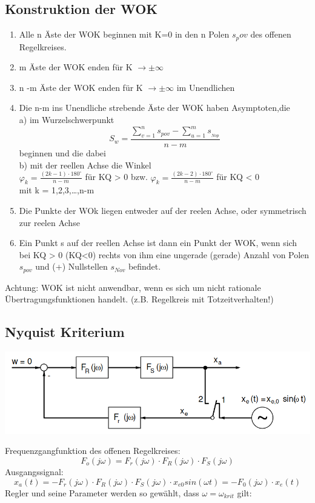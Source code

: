 \documentclass[10pt,a4paper]{article}
\begin{document}
  \subsection{Konstruktion der WOK}
  \begin{mdframed}[style=exercise]
      \begin{enumerate}
        \item Alle n Äste der WOK beginnen mit K=0 in den n Polen $s_pov$ des offenen Regelkreises.\\
        \item m Äste der WOK enden für K $\rightarrow \pm \infty$
        \item n -m Äste der WOK enden für K $\rightarrow \pm \infty$ im Unendlichen
        \item Die n-m ins Unendliche strebende Äste der WOK haben Asymptoten,die\\
            a) im Wurzelschwerpunkt
            \[S_{w}=\frac{\sum_{v=1}^{n} s_{pov}-\sum_{u=1}^{m} s_{_{Nop}}}{n-m}\]
            beginnen und die dabei\\
            b) mit der reellen Achse die Winkel\\
            $\varphi_{k}=\frac{(2 k-1) \cdot 180^{\circ}}{n-m}$ für KQ > 0 bzw.
            $\varphi_{k}=\frac{(2 k-2) \cdot 180^{\circ}}{n-m}$ für KQ < 0 \\
            mit k = 1,2,3,\dots,n-m
        \item Die Punkte der WOk liegen entweder auf der reelen Achse, oder symmetrisch zur reelen Achse
        \item Ein Punkt s auf der reellen Achse ist dann ein Punkt der WOK, wenn sich bei KQ > 0 (KQ<0)
            rechts von ihm eine ungerade (gerade) Anzahl von Polen $s_{pov}$ und (+) Nullstellen $s_{Nov}$ befindet.
\end{enumerate}
Achtung: WOK ist nicht anwendbar, wenn es sich um nicht rationale Übertragungsfunktionen handelt.
 (z.B. Regelkreis mit Totzeitverhalten!)
  \end{mdframed}
\subsection{Nyquist Kriterium}
    \begin{center}
      \includegraphics[width=.45\textwidth]{Figures/Nyquist.png}
    \end{center}
    Frequenzgangfunktion des offenen Regelkreises:
    \[ F_o (j\omega) = F_r (j\omega) \cdot F_R (j\omega) \cdot F_S (j\omega)\]
    Ausgangssignal:
    \[ x_a(t)=-F_r (j\omega) \cdot F_R (j\omega) \cdot F_S (j\omega) \cdot x_{e0} sin(\omega t)=
    -F_0 (j\omega) \cdot x_e (t)\]
    Regler und seine Parameter werden so gewählt, dass $\omega = \omega_{krit}$ gilt:
\end{document}
